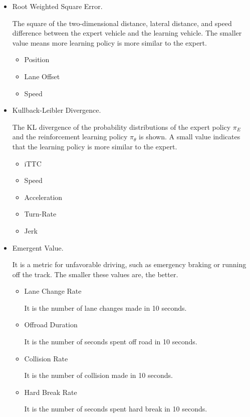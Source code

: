 \begin{itemize}
\item Root Weighted Square Error.

The square of the two-dimensional distance, lateral distance, and speed difference between the expert vehicle and the learning vehicle. The smaller value means more  learning policy is more similar to the expert.

\begin{itemize}
\item Position
\item Lane Offset
\item Speed
\end{itemize}
\item Kullback-Leibler Divergence.

The KL divergence of the probability distributions of the expert policy $\pi_E$ and the reinforcement learning policy $\pi_\theta$ is shown. A small value indicates that the learning policy is more similar to the expert.

\begin{itemize}
\item iTTC
\item Speed
\item Acceleration
\item Turn-Rate
\item Jerk
\end{itemize}
\item Emergent Value.

It is a metric for unfavorable driving, such as emergency braking or running off the track. The smaller these values are, the better.

\begin{itemize}

\item Lane Change Rate

It is the number of lane changes made in 10 seconds.

\item Offroad Duration

It is the number of seconds spent off road in 10 seconds.

\item Collision Rate

It is the number of collision made in 10 seconds.

\item Hard Break Rate

It is the number of seconds spent hard break in 10 seconds.

\end{itemize}
\end{itemize}



